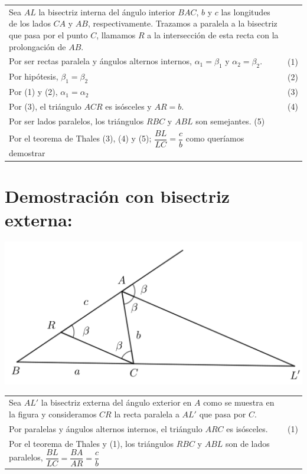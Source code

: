 \documentclass[12pt,a4paper, oneside]{book}
\begin{document}
\begin{tabular}{p{15.9 cm} p{1cm}}
Sea $AL$ la bisectriz interna del ángulo interior $BAC$, $b$ y $c$ las longitudes de los lados $CA$ y $AB$, respectivamente. Trazamos a paralela a la bisectriz que pasa por el punto $C$, llamamos $R$ a la intersección de esta recta con la prolongación de $AB$.
\\Por ser rectas paralela y ángulos alternos internos, $\alpha _1= \beta _1$ y $\alpha _2= \beta _2$. &(1)
\\Por hipótesis, $\beta _1= \beta _2$ &(2)
\\Por (1) y (2), $\alpha _1= \alpha _2$&(3)
\\Por (3), el triángulo $ACR$ es isósceles y $AR=b$. &(4)
\\Por ser lados paralelos, los triángulos $RBC$ y $ABL$ son semejantes. (5)
\\Por el teorema de Thales (3), (4) y (5); $\dfrac{BL}{LC} =\dfrac{c}{b}$ como queríamos demostrar
\end{tabular}
\section{Demostración con bisectriz externa:}
\begin{center}
\includegraphics[scale=0.6]{Imagenes/bisectriz_ext.png} 
\end{center}
\begin{tabular}{p{15.9 cm} p{1cm}}
Sea $AL'$ la bisectriz externa del ángulo exterior en $A$ como se muestra en la figura y consideramos $CR$ la recta paralela a $AL'$ que pasa por $C$.
\\Por paralelas y ángulos alternos internos, el triángulo $ARC$ es isósceles. &(1)
\\Por el teorema de Thales y (1), los triángulos $RBC$ y $ABL$ son de lados paralelos, $\dfrac{BL}{LC}=\dfrac{BA}{AR}=\dfrac{c}{b}$
\end{tabular}
\end{document}
